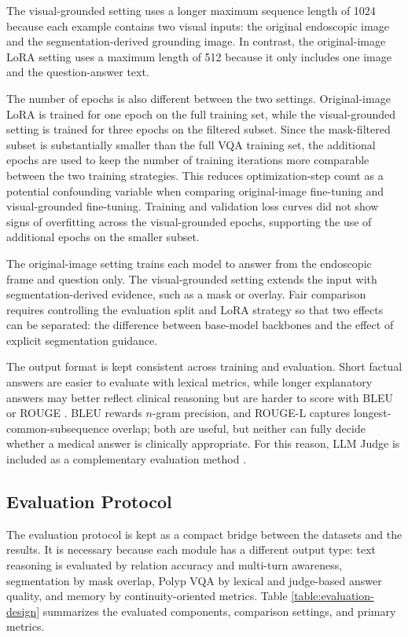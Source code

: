 The visual-grounded setting uses a longer maximum sequence length of 1024 because each example contains two visual inputs: the original endoscopic image and the segmentation-derived grounding image. In contrast, the original-image LoRA setting uses a maximum length of 512 because it only includes one image and the question-answer text.

The number of epochs is also different between the two settings. Original-image LoRA is trained for one epoch on the full training set, while the visual-grounded setting is trained for three epochs on the filtered subset. Since the mask-filtered subset is substantially smaller than the full VQA training set, the additional epochs are used to keep the number of training iterations more comparable between the two training strategies. This reduces optimization-step count as a potential confounding variable when comparing original-image fine-tuning and visual-grounded fine-tuning. Training and validation loss curves did not show signs of overfitting across the visual-grounded epochs, supporting the use of additional epochs on the smaller subset.

The original-image setting trains each model to answer from the endoscopic frame and question only. The visual-grounded setting extends the input with segmentation-derived evidence, such as a mask or overlay. Fair comparison requires controlling the evaluation split and LoRA strategy so that two effects can be separated: the difference between base-model backbones and the effect of explicit segmentation guidance.

The output format is kept consistent across training and evaluation. Short factual answers are easier to evaluate with lexical metrics, while longer explanatory answers may better reflect clinical reasoning but are harder to score with BLEU or ROUGE \cite{bleu,rouge}. BLEU rewards $n$-gram precision, and ROUGE-L captures longest-common-subsequence overlap; both are useful, but neither can fully decide whether a medical answer is clinically appropriate. For this reason, LLM Judge is included as a complementary evaluation method \cite{llm_as_judge}.

\subsection{Evaluation Protocol}

The evaluation protocol is kept as a compact bridge between the datasets and the results. It is necessary because each module has a different output type: text reasoning is evaluated by relation accuracy and multi-turn awareness, segmentation by mask overlap, Polyp VQA by lexical and judge-based answer quality, and memory by continuity-oriented metrics. Table \ref{table:evaluation-design} summarizes the evaluated components, comparison settings, and primary metrics.

